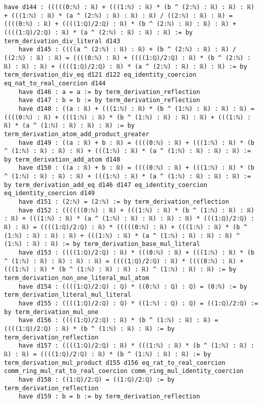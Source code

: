 \documentclass{article}
\begin{document}
\begin{tcolorbox}[colback=white!10, width=\linewidth]
\begin{lstlisting}[language=Lean4]
    have d144 : (((((0:ℕ) : ℝ) + (((1:ℕ) : ℝ) * (b ^ (2:ℕ) : ℝ) : ℝ) : ℝ) + (((1:ℕ) : ℝ) * (a ^ (2:ℕ) : ℝ) : ℝ) : ℝ) / ((2:ℕ) : ℝ) : ℝ) = ((((0:ℕ) : ℝ) + ((((1:ℚ)/2:ℚ) : ℝ) * (b ^ (2:ℕ) : ℝ) : ℝ) : ℝ) + ((((1:ℚ)/2:ℚ) : ℝ) * (a ^ (2:ℕ) : ℝ) : ℝ) : ℝ) := by term_derivation_div_literal d143
    have d145 : ((((a ^ (2:ℕ) : ℝ) : ℝ) + (b ^ (2:ℕ) : ℝ) : ℝ) / ((2:ℕ) : ℝ) : ℝ) = ((((0:ℕ) : ℝ) + ((((1:ℚ)/2:ℚ) : ℝ) * (b ^ (2:ℕ) : ℝ) : ℝ) : ℝ) + ((((1:ℚ)/2:ℚ) : ℝ) * (a ^ (2:ℕ) : ℝ) : ℝ) : ℝ) := by term_derivation_div_eq d121 d122 eq_identity_coercion eq_nat_to_real_coercion d144
    have d146 : a = a := by term_derivation_reflection
    have d147 : b = b := by term_derivation_reflection
    have d148 : ((a : ℝ) + (((1:ℕ) : ℝ) * (b ^ (1:ℕ) : ℝ) : ℝ) : ℝ) = ((((0:ℕ) : ℝ) + (((1:ℕ) : ℝ) * (b ^ (1:ℕ) : ℝ) : ℝ) : ℝ) + (((1:ℕ) : ℝ) * (a ^ (1:ℕ) : ℝ) : ℝ) : ℝ) := by term_derivation_atom_add_product_greater
    have d149 : ((a : ℝ) + b : ℝ) = ((((0:ℕ) : ℝ) + (((1:ℕ) : ℝ) * (b ^ (1:ℕ) : ℝ) : ℝ) : ℝ) + (((1:ℕ) : ℝ) * (a ^ (1:ℕ) : ℝ) : ℝ) : ℝ) := by term_derivation_add_atom d148
    have d150 : ((a : ℝ) + b : ℝ) = ((((0:ℕ) : ℝ) + (((1:ℕ) : ℝ) * (b ^ (1:ℕ) : ℝ) : ℝ) : ℝ) + (((1:ℕ) : ℝ) * (a ^ (1:ℕ) : ℝ) : ℝ) : ℝ) := by term_derivation_add_eq d146 d147 eq_identity_coercion eq_identity_coercion d149
    have d151 : (2:ℕ) = (2:ℕ) := by term_derivation_reflection
    have d152 : ((((((0:ℕ) : ℝ) + (((1:ℕ) : ℝ) * (b ^ (1:ℕ) : ℝ) : ℝ) : ℝ) + (((1:ℕ) : ℝ) * (a ^ (1:ℕ) : ℝ) : ℝ) : ℝ) : ℝ) * (((1:ℚ)/2:ℚ) : ℝ) : ℝ) = ((((1:ℚ)/2:ℚ) : ℝ) * (((((0:ℕ) : ℝ) + (((1:ℕ) : ℝ) * (b ^ (1:ℕ) : ℝ) : ℝ) : ℝ) + (((1:ℕ) : ℝ) * (a ^ (1:ℕ) : ℝ) : ℝ) : ℝ) ^ (1:ℕ) : ℝ) : ℝ) := by term_derivation_base_mul_literal
    have d153 : ((((1:ℚ)/2:ℚ) : ℝ) * (((0:ℕ) : ℝ) + (((1:ℕ) : ℝ) * (b ^ (1:ℕ) : ℝ) : ℝ) : ℝ) : ℝ) = ((((1:ℚ)/2:ℚ) : ℝ) * ((((0:ℕ) : ℝ) + (((1:ℕ) : ℝ) * (b ^ (1:ℕ) : ℝ) : ℝ) : ℝ) ^ (1:ℕ) : ℝ) : ℝ) := by term_derivation_non_one_literal_mul_atom
    have d154 : ((((1:ℚ)/2:ℚ) : ℚ) * ((0:ℕ) : ℚ) : ℚ) = (0:ℕ) := by term_derivation_literal_mul_literal
    have d155 : ((((1:ℚ)/2:ℚ) : ℚ) * ((1:ℕ) : ℚ) : ℚ) = ((1:ℚ)/2:ℚ) := by term_derivation_mul_one
    have d156 : ((((1:ℚ)/2:ℚ) : ℝ) * (b ^ (1:ℕ) : ℝ) : ℝ) = ((((1:ℚ)/2:ℚ) : ℝ) * (b ^ (1:ℕ) : ℝ) : ℝ) := by term_derivation_reflection
    have d157 : ((((1:ℚ)/2:ℚ) : ℝ) * (((1:ℕ) : ℝ) * (b ^ (1:ℕ) : ℝ) : ℝ) : ℝ) = ((((1:ℚ)/2:ℚ) : ℝ) * (b ^ (1:ℕ) : ℝ) : ℝ) := by term_derivation_mul_product d155 d156 eq_rat_to_real_coercion comm_ring_mul_rat_to_real_coercion comm_ring_mul_identity_coercion
    have d158 : ((1:ℚ)/2:ℚ) = ((1:ℚ)/2:ℚ) := by term_derivation_reflection
    have d159 : b = b := by term_derivation_reflection

\end{lstlisting}
\end{tcolorbox}
\end{document}
